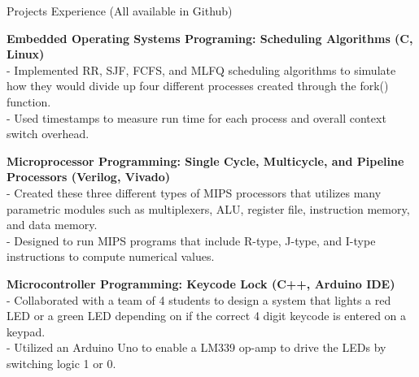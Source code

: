 \documentclass{resume} %
\begin{document}
\begin{rSection}{Projects Experience (All available in Github)}

{\bf Embedded Operating Systems Programing: Scheduling Algorithms (C, Linux)
}
\\- Implemented RR, SJF, FCFS, and MLFQ scheduling algorithms to simulate how they would divide up four different processes created through the fork() function.
\\- Used timestamps to measure run time for each process and overall context switch overhead.

{\bf Microprocessor Programming: Single Cycle, Multicycle, and Pipeline Processors (Verilog, Vivado)}
\\- Created these three different types of MIPS processors that utilizes many parametric modules such as multiplexers, ALU, register file, instruction memory, and data memory.
\\- Designed to run MIPS programs that include R-type, J-type, and I-type instructions to compute numerical values.

{\bf Microcontroller Programming: Keycode Lock (C++, Arduino IDE) }
\\- Collaborated with a team of 4 students to design a system that lights a red LED or a green LED depending on if the correct 4 digit keycode is entered on a keypad.
\\- Utilized an Arduino Uno to enable a LM339 op-amp to drive the LEDs by switching logic 1 or 0.   




\end{rSection}
\end{document}

